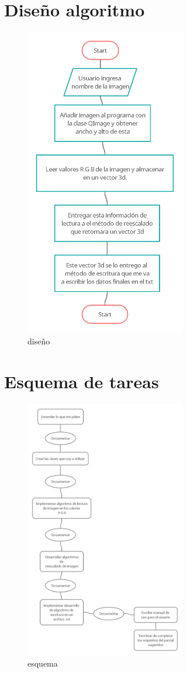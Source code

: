 \documentclass{article}
\begin{document}
\section{Diseño algoritmo}
\begin{figure}[h]
\includegraphics[width=7cm]{imag-analisis/DisenoAlgoritmo.png}
\centering
\caption{diseño}
\label{fig:diseño}
\end{figure}
\newpage
\section{Esquema de tareas}
\begin{figure}[h]
\includegraphics[width=7cm]{imag-analisis/esquema.png}
\centering
\caption{esquema}
\label{fig:esqueme}
\end{figure}
\end{document}
